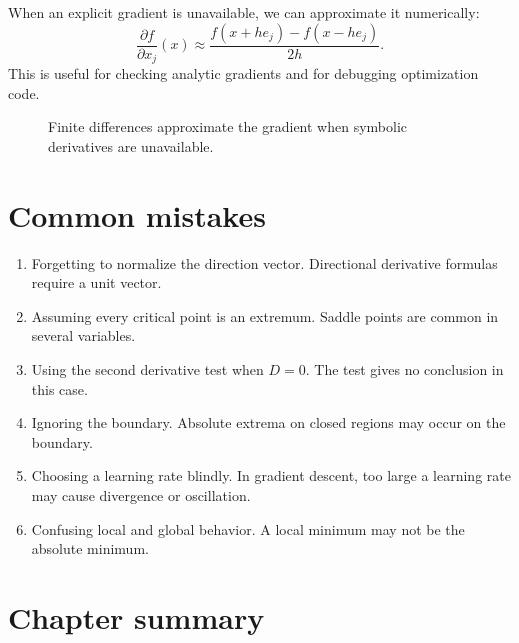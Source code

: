 \documentclass[11pt]{article}
\begin{document}
When an explicit gradient is unavailable, we can approximate it numerically:
\[
\frac{\partial f}{\partial x_j}(x)\approx \frac{f(x+h e_j)-f(x-h e_j)}{2h}.
\]
This is useful for checking analytic gradients and for debugging optimization code.

\begin{figure}[H]
\centering
{}
\caption{Finite differences approximate the gradient when symbolic derivatives are unavailable.}
\end{figure}

\section{Common mistakes}

\begin{warningbox}
\begin{enumerate}
  \item Forgetting to normalize the direction vector. Directional derivative formulas require a unit vector.
  \item Assuming every critical point is an extremum. Saddle points are common in several variables.
  \item Using the second derivative test when $D=0$. The test gives no conclusion in this case.
  \item Ignoring the boundary. Absolute extrema on closed regions may occur on the boundary.
  \item Choosing a learning rate blindly. In gradient descent, too large a learning rate may cause divergence or oscillation.
  \item Confusing local and global behavior. A local minimum may not be the absolute minimum.
\end{enumerate}
\end{warningbox}

\section{Chapter summary}
\end{document}
